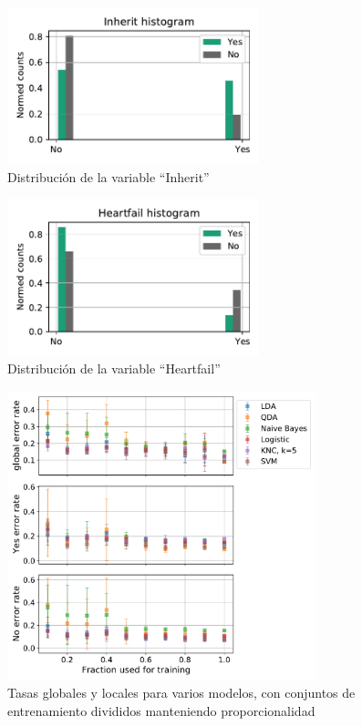 \documentclass[11pt]{article}
\begin{document}
\begin{figure}[H]
    \centering
    \includegraphics[width = 0.65\textwidth]{2-Inherit-dist.pdf}
    \caption{Distribución de la variable ``Inherit''}
    \label{2-Inherit-dist}
\end{figure}
\begin{figure}[H]
    \centering
    \includegraphics[width = 0.65\textwidth]{2-Heartfail-dist.pdf}
    \caption{Distribución de la variable ``Heartfail''}
    \label{2-Heartfail-dist}
\end{figure}
\begin{figure}[H]
    \centering
    \includegraphics[width = 0.8\textwidth]{2-gen-eq-sizeDependence.pdf}
    \caption{Tasas globales y locales para varios modelos, con conjuntos de entrenamiento divididos manteniendo proporcionalidad}
    \label{2-gen-eq-sizeDependence}
\end{figure}
\end{document}
